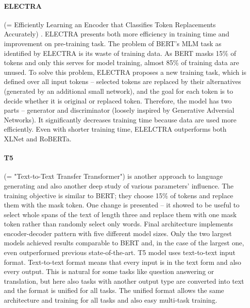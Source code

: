 \paragraph{ELECTRA} (= Efficiently Learning an Encoder that Classifies Token Replacements Accurately) \citep{Clark2020}. ELECTRA presents both more efficiency in training time and improvement on pre-training task. The problem of BERT's MLM task as identified by ELECTRA is its waste of training data. As BERT masks 15\% of tokens and only this serves for model training, almost 85\% of training data are unused. To solve this problem, ELECTRA proposes a new training task, which is defined over all input tokens -- selected tokens are replaced by their alternatives (generated by an additional small network), and the goal for each token is to decide whether it is original or replaced token. Therefore, the model has two parts -- generator and discriminator (loosely inspired by Generative Adversial Networks). It significantly decreases training time because data are used more efficiently. Even with shorter training time, ELELCTRA outperforms both XLNet and RoBERTa.
\paragraph{T5} (= "Text-to-Text Transfer Transformer") \citep{Raffel2019a} is another approach to language generating and also another deep study of various parameters' influence. The training objective is similar to BERT; they choose 15\% of tokens and replace them with the mask token. One change is presented -- it showed to be useful to select whole spans of the text of length three and replace them with one mask token rather than randomly select only words. Final architecture implements encoder-decoder pattern with five different model sizes. Only the two largest models achieved results comparable to BERT and, in the case of the largest one, even outperformed previous state-of-the-art. T5 model uses text-to-text input format. Text-to-text format means that every input is in the text form and also every output. This is natural for some tasks like question answering or translation, but here also tasks with another output type are converted into text and the format is unified for all tasks. The unified format allows the same architecture and training for all tasks and also easy multi-task training.  
